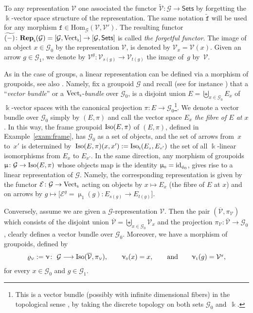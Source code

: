 \documentclass[pdftex]{sigma}
\numberwithin{equation}{section}
\renewcommand{\hom}[3]{\mathrm{Hom}_{\Sscript{#1}}\left(#2, #3\right)}
\newcommand{\td}[1]{\widetilde{#1}}
\newcommand{\bara}[1]{\overline{#1}}
\newcommand{\Rep}[1]{\mathbf{Rep}_{\Sscript{\Bbbk}}(#1)}
\newcommand{\Vect}{{\rm Vect}_{\Sscript{\Bbbk}}}
\newcommand{\tF}{\texttt{f}}
\newcommand{\Go}{\cG_{\Sscript{0}}}
\newcommand{\Ga}{\cG_{\Sscript{1}}}
\newcommand{\Vx}{\cV_{\Sscript{x}}}
\newcommand{\Vg}{\cV^{\Sscript{g}}}
\newcommand{\cE}{{\mathcal E}}
\newcommand{\cG}{{\mathcal G}}
\newcommand{\cV}{{\mathcal V}}
\newcommand{\Sets}{\mathsf{Sets}}
\newcommand{\Sscript}[1]{\scriptscriptstyle{#1}}
\begin{document}
To any representation $\cV$ one associated the functor $\tilde{\cV}\colon \cG \to \Sets$ by forgetting the $\Bbbk$-vector space structure of the representation. The same notation $\tilde{\tF}$ will be used for any morphism $\tF \in \hom{\cG}{\cV}{\cV'}$. The resulting functor $\td{(-)}\colon \Rep{\cG}=[\cG, \Vect] \to [\cG, \Sets]$ is called \emph{the forgetful functor}. The image of an object $x \in \Go$ by the representation $\cV$, is denoted by $\Vx=\cV(x)$. Given an arrow $g \in \Ga$, we denote by $\Vg\colon \cV_{\Sscript{s(g)}} \to \cV_{\Sscript{t(g)}}$ the image of~$g$ by~$\cV$.

\begin{Remark}\label{rem:FrameGrpd}As in the case of groups, a linear representation can be defined via a morphism of groupoids, see also \cite[Definition~1.11]{Renault:1980}. Namely, fix a groupoid $\cG$ and recall (see for instance \cite[p.~98]{Sternberg:1994}) that a ``\emph{vector bundle}'' or a $\Vect$-\emph{bundle} over $\Go$, is a disjoint union $E=\biguplus_{ x \in \Go}E_{\Sscript{x}}$ of $\Bbbk$-vector spaces with the canonical projection $\pi\colon E \to \Go$\footnote{This is a vector bundle (possibly with infinite dimensional fibers) in the topological sense \cite[Definition~2.1]{Karoubi:1978}, by taking the discrete topology on both sets $\Go$ and~$\Bbbk$.}. We denote a vector bundle over $\Go$ simply by $(E,\pi)$ and call the vector space $E_{\Sscript{x}}$ \emph{the fibre of $E$ at $x$}. In this way, the frame groupoid ${\rm Iso}(E,\pi)$ of $(E,\pi)$, defined in Example~\ref{exam:frame}, has $\Go$ as a set of objects, and the set of arrows from~$x$ to~$x'$ is determined by~${\rm Iso}(E,\pi)(x,x'):={\rm Iso}_{\Sscript{\Bbbk}}( E_{\Sscript{x}}, E_{\Sscript{x'}})$ the set of all $\Bbbk$-linear isomorphisms from $E_{\Sscript{x}}$ to $E_{\Sscript{x'}}$. In the same direction, any morphism of groupoids $\upmu\colon \cG \to {\rm Iso}(E,\pi)$ whose objects map is the identity $\upmu_{\Sscript{0}}={\rm id}_{\Sscript{\Go}}$, gives rise to a linear representation of $\cG$. Namely, the corresponding representation is given by the functor $\cE\colon \cG \to \Vect$ acting on objects by $x \mapsto E_{\Sscript{x}}$ (the fibre of $E$ at $x$) and on arrows by $g \mapsto \big[\cE^{\Sscript{g}}=\upmu_{\Sscript{1}}(g)\colon E_{\Sscript{s(g)}} \to E_{\Sscript{t(g)}}\big]$.

Conversely, assume we are given a $\cG$-representation $\cV$. Then the pair $(\bara{\cV}, \pi_{\Sscript{\cV}})$ which consists of the disjoint union $\bara{\cV}=\biguplus_{x \in \Go}\Vx$ and the projection $\pi_{\Sscript{\cV}}\colon \bar{\cV} \to \Go$, clearly defines a vector bundle over $\Go$. Moreover, we have a morphism of groupoids, defined by
\begin{gather}\label{Eq:rhoV}
\varrho_{\Sscript{\cV}}:=\upnu\colon \ \cG \longrightarrow {\rm Iso}(\bara{\cV}, \pi_{\Sscript{\cV}}), \qquad \upnu_{\Sscript{0}}(x)=x, \qquad \text{and} \qquad \upnu_{\Sscript{1}}(g)=\Vg,
\end{gather}
for every $x \in \Go$ and $g \in \Ga$.


\end{Remark}
\end{document}
